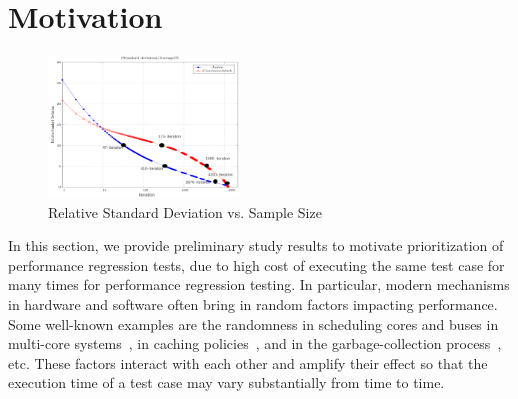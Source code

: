 \section{Motivation}
\label{sec:motivation}



\begin{figure}
	\centering
	\includegraphics[width=0.45\textwidth]{performance/images/standard-deviation.pdf}
	\caption{Relative Standard Deviation vs. Sample Size}	
	\label{fig:motiv-math}	
	
\end{figure}

In this section, we provide preliminary study results to motivate prioritization of performance regression tests, due to high cost of executing the same test case for many times for performance regression testing. In particular, modern mechanisms in hardware and software often bring in random factors impacting performance. Some well-known examples are the randomness in scheduling cores and buses in multi-core systems~\cite{MultiCoreRandom}, in caching policies~\cite{CacheRandom}, and in the garbage-collection process~\cite{GBRandom}, etc. These factors interact with each other and amplify their effect so that the execution time of a test case may vary substantially from time to time. 

